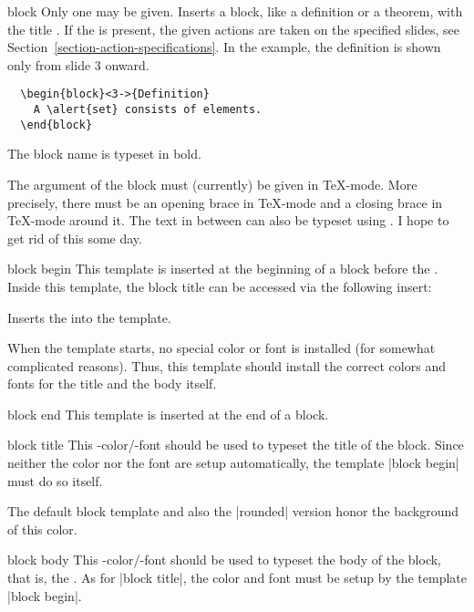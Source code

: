 \begin{environment}{{block}}
  Only one  may be given.
  Inserts a block, like a definition or a theorem, with the title
  . If the  is present,
  the given actions are taken on the specified slides, see
  Section~\ref{section-action-specifications}. In the example, the
  definition is shown only from slide 3 onward.
  \example
\begin{verbatim}
  \begin{block}<3->{Definition}
    A \alert{set} consists of elements.
  \end{block}
\end{verbatim}

  \articlenote
  The block name is typeset in bold.

  \lyxnote
  The argument of the block must (currently) be given in
  \TeX-mode. More precisely, there must be an opening brace in
  \TeX-mode and a closing brace in \TeX-mode around it. The text
  in between can also be typeset using \LyX. I hope to get rid of this
  some day.

  \begin{element}{block begin}\yes\no\no
    This template is inserted at the beginning of a block before the
    . Inside this
    template, the block title can be accessed via the following
    insert:
    \begin{itemize}
      \iteminsert{\insertblocktitle}
      Inserts the  into the template.
    \end{itemize}

    When the template starts, no special color or font is installed
    (for somewhat complicated reasons). Thus, this template should
    install the correct colors and fonts for the title and the body itself.
  \end{element}

  \begin{element}{block end}\yes\no\no
    This template is inserted at the end of a block.
  \end{element}

  \begin{element}{block title}\no\yes\yes
    This \beamer-color/-font should be used to typeset the title of
    the block. Since neither the color nor the font are setup
    automatically, the template |block begin| must do so itself.

    The default block template and also the |rounded| version honor
    the background of this color.
  \end{element}

  \begin{element}{block body}\no\yes\yes
    This \beamer-color/-font should be used to typeset the body of the
    block, that is, the . As for
    |block title|, the color and font must be setup by the template
    |block begin|.
  \end{element}
\end{environment}


